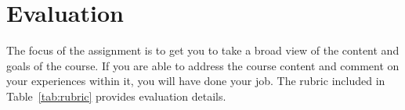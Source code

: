\documentclass[9pt,twocolumn,oneside]{amsart}	%
\begin{document}
\section{Evaluation} %
\label{sec:rubric}
The focus of the assignment is to get you to take a broad view of the content and goals of the course. If you are able to address the course content and comment on your experiences within it, you will have done your job. The rubric included in Table~\ref{tab:rubric} provides evaluation details.




\end{document}
